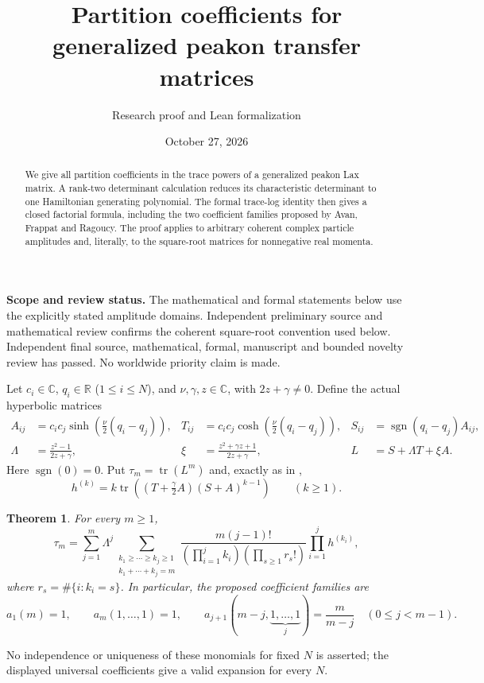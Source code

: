 \documentclass[11pt]{article}
\title{Partition coefficients for generalized peakon transfer matrices}
\author{Research proof and Lean formalization}
\date{October 27, 2026}
\newtheorem{theorem}{Theorem}
\begin{document}
\maketitle
\begin{abstract}
We give all partition coefficients in the trace powers of a generalized peakon Lax matrix. A rank-two determinant calculation reduces its characteristic determinant to one Hamiltonian generating polynomial. The formal trace-log identity then gives a closed factorial formula, including the two coefficient families proposed by Avan, Frappat and Ragoucy. The proof applies to arbitrary coherent complex particle amplitudes and, literally, to the square-root matrices for nonnegative real momenta.
\end{abstract}
\noindent\textbf{Scope and review status.} The mathematical and formal statements below use the explicitly stated amplitude domains. Independent preliminary source and mathematical review confirms the coherent square-root convention used below. Independent final source, mathematical, formal, manuscript and bounded novelty review has passed. No worldwide priority claim is made.

Let $c_i\in\mathbb C$, $q_i\in\mathbb R$ ($1\leq i\leq N$), and $\nu,\gamma,z\in\mathbb C$, with $2z+\gamma\ne0$. Define the actual hyperbolic matrices
\begin{align*}
 A_{ij}&=c_ic_j\sinh\!\left(\frac\nu2(q_i-q_j)\right),&
 T_{ij}&=c_ic_j\cosh\!\left(\frac\nu2(q_i-q_j)\right),&
 S_{ij}&=\operatorname{sgn}(q_i-q_j)A_{ij},\\
 \Lambda&=\frac{z^2-1}{2z+\gamma},&
 \xi&=\frac{z^2+\gamma z+1}{2z+\gamma},&
 L&=S+\Lambda T+\xi A.
\end{align*}
Here $\operatorname{sgn}(0)=0$. Put $\tau_m=\operatorname{tr}(L^m)$ and, exactly as in \cite[eq.~(5.17)]{AFR},
\begin{equation}\label{h}
 h^{(k)}=k\operatorname{tr}\left((T+\tfrac\gamma2 A)(S+A)^{k-1}\right)\qquad(k\geq1).
\end{equation}

\begin{theorem}\label{main}
For every $m\geq1$,
\begin{equation}\label{expansion}
 \tau_m=\sum_{j=1}^m\Lambda^j
 \sum_{\substack{k_1\geq\cdots\geq k_j\geq1\\k_1+\cdots+k_j=m}}
 \frac{m(j-1)!}{(\prod_{i=1}^j k_i)(\prod_{s\geq1}r_s!)}
 \prod_{i=1}^j h^{(k_i)},
\end{equation}
where $r_s=\#\{i:k_i=s\}$. In particular, the proposed coefficient families are
\begin{equation}\label{special}
 a_1(m)=1,\qquad a_m(1,\ldots,1)=1,\qquad
 a_{j+1}(m-j,\underbrace{1,\ldots,1}_{j})=\frac m{m-j}\quad(0\leq j<m-1).
\end{equation}
\end{theorem}
No independence or uniqueness of these monomials for fixed $N$ is asserted; the displayed universal coefficients give a valid expansion for every $N$.
\end{document}

